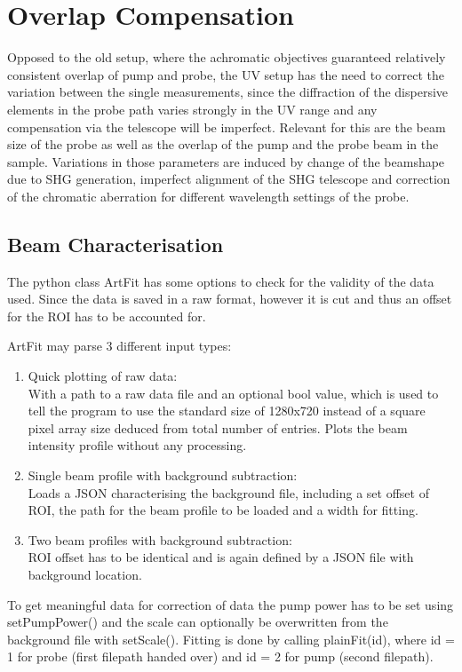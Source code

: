 \documentclass[twoside,openright]{scrreprt}
\begin{document}
\section{Overlap Compensation}
Opposed to the old setup, where the achromatic objectives guaranteed relatively consistent overlap of pump and probe, the UV setup has the need to correct the variation between the single measurements, since the diffraction of the dispersive elements in the probe path varies strongly in the UV range and any compensation via the telescope will be imperfect.\newline
Relevant for this are the beam size of the probe as well as the overlap of the pump and the probe beam in the sample. Variations in those parameters are induced by change of the beamshape due to SHG generation, imperfect alignment of the SHG telescope and correction of the chromatic aberration for different wavelength settings of the probe.\newline

\subsection{Beam Characterisation}
The python class ArtFit has some options to check for the validity of the data used. Since the data is saved in a raw format, however it is cut and thus an offset for the ROI has to be accounted for.

ArtFit may parse 3 different input types:
\begin{enumerate}
\item Quick plotting of raw data:\\
With a path to a raw data file and an optional bool value, which is used to tell the program to use the standard size of 1280x720 instead of a square pixel array size deduced from total number of entries. Plots the beam intensity profile without any processing.
\item Single beam profile with background subtraction: \\
Loads a JSON characterising the background file, including a set offset of ROI, the path for the beam profile to be loaded and a width for fitting.
\item Two beam profiles with background subtraction: \\
ROI offset has to be identical and is again defined by a JSON file with background location.
\end{enumerate}

To get meaningful data for correction of data the pump power has to be set using setPumpPower() and the scale can optionally be overwritten from the background file with setScale(). Fitting is done by calling plainFit(id), where id = 1 for probe (first filepath handed over) and id = 2 for pump (second filepath).
\end{document}
